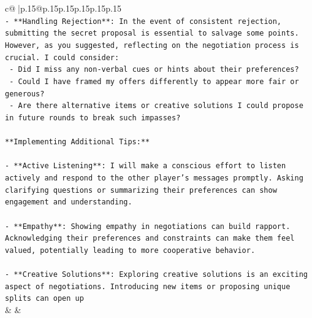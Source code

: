 \documentclass{article}
\begin{document}
{\begin{supertabular}{c@{$\;$}|p{.15\linewidth}@{}p{.15\linewidth}p{.15\linewidth}p{.15\linewidth}p{.15\linewidth}p{.15\linewidth}}
{{{\\ 
\texttt{{-} **Handling Rejection**: In the event of consistent rejection, submitting the secret proposal is essential to salvage some points. However, as you suggested, reflecting on the negotiation process is crucial. I could consider:} \\
\texttt{  {-} Did I miss any non{-}verbal cues or hints about their preferences?} \\
\texttt{  {-} Could I have framed my offers differently to appear more fair or generous?} \\
\texttt{  {-} Are there alternative items or creative solutions I could propose in future rounds to break such impasses?} \\
\\ 
\texttt{**Implementing Additional Tips:**} \\
\\ 
\texttt{{-} **Active Listening**: I will make a conscious effort to listen actively and respond to the other player's messages promptly. Asking clarifying questions or summarizing their preferences can show engagement and understanding.} \\
\\ 
\texttt{{-} **Empathy**: Showing empathy in negotiations can build rapport. Acknowledging their preferences and constraints can make them feel valued, potentially leading to more cooperative behavior.} \\
\\ 
\texttt{{-} **Creative Solutions**: Exploring creative solutions is an exciting aspect of negotiations. Introducing new items or proposing unique splits can open up} \\
            }
        }
    }
    & & \\ \\


\end{supertabular}}
\end{document}
